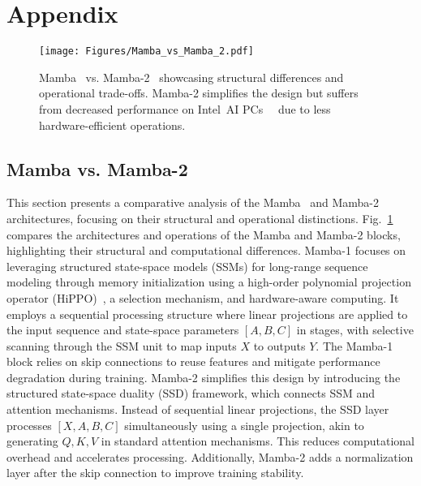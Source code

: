 \newpage
\section{Appendix}

\begin{figure}[b!]
\begin{center}
\texttt{[image: Figures/Mamba\_vs\_Mamba\_2.pdf]}
\end{center}
\caption{Mamba~\cite{mamba} vs. Mamba-2~\cite{mamba2} showcasing structural differences and operational trade-offs. Mamba-2 simplifies the design but suffers from decreased performance on Intel\textregistered\ AI PCs~\cite{lnl}~\cite{mtl} due to less hardware-efficient operations.}\label{fig:mamba_vs_mamba2}
\end{figure}

\subsection{Mamba vs. Mamba-2}\label{subsec:mamba1_vs_2}
This section presents a comparative analysis of the Mamba~\cite{mamba} and Mamba-2~\cite{mamba2} architectures, focusing on their structural and operational distinctions. Fig.~\ref{fig:mamba_vs_mamba2} compares the architectures and operations of the Mamba and Mamba-2 blocks, highlighting their structural and computational differences. Mamba-1 focuses on leveraging structured state-space models (SSMs) for long-range sequence modeling through memory initialization using a high-order polynomial projection operator (HiPPO)~\cite{hippo}, a selection mechanism, and hardware-aware computing. It employs a sequential processing structure where linear projections are applied to the input sequence and state-space parameters $[A, B, C]$ in stages, with selective scanning through the SSM unit to map inputs $X$ to outputs $Y$. The Mamba-1 block relies on skip connections to reuse features and mitigate performance degradation during training. Mamba-2 simplifies this design by introducing the structured state-space duality (SSD) framework, which connects SSM and attention mechanisms. Instead of sequential linear projections, the SSD layer processes $[X, A, B, C]$ simultaneously using a single projection, akin to generating $Q, K, V$ in standard attention mechanisms. This reduces computational overhead and accelerates processing. Additionally, Mamba-2 adds a normalization layer after the skip connection to improve training stability. 

